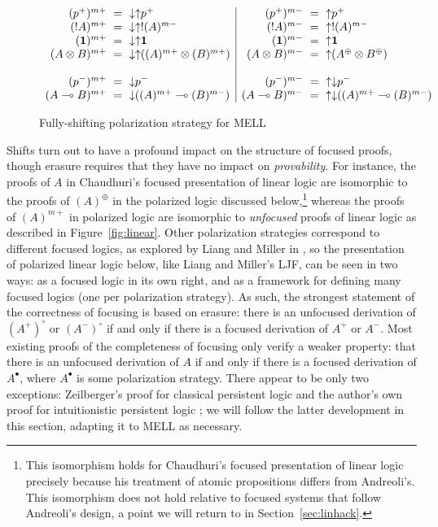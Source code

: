 \begin{figure}
{\small \[
\begin{array}{rcl|rcl}
(p^+)^{m+} & \!\!\!=\!\!\! & {\downarrow}{\uparrow}p^+ &
(p^+)^{m-} & \!\!\!=\!\!\! & {\uparrow}p^+
\\
({!}A)^{m+} & \!\!\!=\!\!\! & {\downarrow}{\uparrow}{!}(A)^{m-} &
({!}A)^{m-} & \!\!\!=\!\!\! & {\uparrow}{!}(A)^{m-}
\\
(\one)^{m+} & \!\!\!=\!\!\! & {\downarrow}{\uparrow}\one &
(\one)^{m-} & \!\!\!=\!\!\! & {\uparrow}\one 
\\
(A \otimes B)^{m+} & \!\!\!=\!\!\!
    & {\downarrow}{\uparrow}((A)^{m+} \otimes (B)^{m+}) &
(A \otimes B)^{m-} & \!\!\!=\!\!\! & {\uparrow}(A^\oplus \otimes B^\oplus)
\\
& & & & & 
\\
(p^-)^{m+} & \!\!\!=\!\!\! & {\downarrow}p^- &
(p^-)^{m-} & \!\!\!=\!\!\! & {\uparrow}{\downarrow}p^- 
\\
(A \lolli B)^{m+} & \!\!\!=\!\!\! & {\downarrow}((A)^{m+} \lolli (B)^{m-}) &
(A \lolli B)^{m-} & \!\!\!=\!\!\!
     & {\uparrow}{\downarrow}((A)^{m+} \lolli (B)^{m-})
\end{array}
\]}

\caption{Fully-shifting polarization strategy for MELL}
\label{fig:lin-maxshift}
\end{figure}

Shifts turn out to have a profound impact on the structure of focused
proofs, though erasure requires that they have no impact on {\it
  provability}. For instance, the proofs of $A$ in Chaudhuri's focused
presentation of linear logic are isomorphic to the proofs of
$(A)^\oplus$ in the polarized logic discussed below,\footnote{This
  isomorphism holds for Chaudhuri's focused presentation of linear
  logic precisely because his treatment of atomic propositions differs
  from Andreoli's. This isomorphism does not hold relative to focused
  systems that follow Andreoli's design, a point we will return to in
  Section~\ref{sec:linhack}.} whereas the proofs of $(A)^{m+}$ in
polarized logic are isomorphic to {\it unfocused} proofs of linear
logic as described in Figure~\ref{fig:linear}. Other polarization
strategies correspond to different focused logics, as explored by
Liang and Miller in \cite{liang09focusing}, so the presentation of
polarized linear logic below, like Liang and Miller's LJF, can be seen
in two ways: as a focused logic in its own right, and as a framework
for defining many focused logics (one per polarization strategy). As
such, the strongest statement of the correctness of focusing is based
on erasure: there is an unfocused derivation of $(A^+)^\circ$ or
$(A^-)^\circ$ if and only if there is a focused derivation of $A^+$ or
$A^-$.  Most existing proofs of the completeness of focusing only
verify a weaker property: that there is an unfocused derivation of $A$
if and only if there is a focused derivation of $A^\bullet$, where
$A^\bullet$ is some polarization strategy.  There appear to be only
two exceptions: Zeilberger's proof for classical persistent logic
\cite{zeilberger08unity} and the author's own proof for intuitionistic
persistent logic \cite{simmons11structural}; we will follow the latter
development in this section, adapting it to MELL as necessary.

